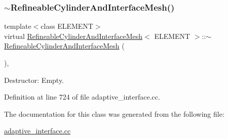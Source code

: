 \subsubsection{\texorpdfstring{$\sim$\+Refineable\+Cylinder\+And\+Interface\+Mesh()}{~RefineableCylinderAndInterfaceMesh()}}
{\footnotesize\ttfamily template$<$class E\+L\+E\+M\+E\+NT$>$ \\
virtual \hyperlink{classRefineableCylinderAndInterfaceMesh}{Refineable\+Cylinder\+And\+Interface\+Mesh}$<$ E\+L\+E\+M\+E\+NT $>$\+::$\sim$\hyperlink{classRefineableCylinderAndInterfaceMesh}{Refineable\+Cylinder\+And\+Interface\+Mesh} (\begin{DoxyParamCaption}{ }\end{DoxyParamCaption})\hspace{0.3cm}{\ttfamily [inline]}, {\ttfamily [virtual]}}



Destructor\+: Empty. 



Definition at line 724 of file adaptive\+\_\+interface.\+cc.



The documentation for this class was generated from the following file\+:\begin{DoxyCompactItemize}
\item 
\hyperlink{adaptive__interface_8cc}{adaptive\+\_\+interface.\+cc}\end{DoxyCompactItemize}

